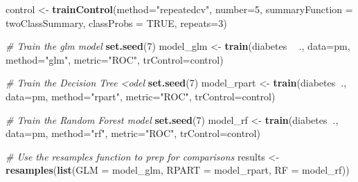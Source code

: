 \documentclass[]{book}
\newenvironment{Shaded}{\begin{snugshade}}{\end{snugshade}}
\newcommand{\KeywordTok}[1]{\textcolor[rgb]{0.13,0.29,0.53}{\textbf{#1}}}
\newcommand{\DataTypeTok}[1]{\textcolor[rgb]{0.13,0.29,0.53}{#1}}
\newcommand{\DecValTok}[1]{\textcolor[rgb]{0.00,0.00,0.81}{#1}}
\newcommand{\StringTok}[1]{\textcolor[rgb]{0.31,0.60,0.02}{#1}}
\newcommand{\CommentTok}[1]{\textcolor[rgb]{0.56,0.35,0.01}{\textit{#1}}}
\newcommand{\OtherTok}[1]{\textcolor[rgb]{0.56,0.35,0.01}{#1}}
\newcommand{\OperatorTok}[1]{\textcolor[rgb]{0.81,0.36,0.00}{\textbf{#1}}}
\newcommand{\NormalTok}[1]{#1}
\begin{document}
\begin{Shaded}
\begin{Highlighting}[]
\NormalTok{control <-}\StringTok{ }\KeywordTok{trainControl}\NormalTok{(}\DataTypeTok{method=}\StringTok{"repeatedcv"}\NormalTok{, }
                        \DataTypeTok{number=}\DecValTok{5}\NormalTok{, }
                        \DataTypeTok{summaryFunction =}\NormalTok{ twoClassSummary,}
                        \DataTypeTok{classProbs =} \OtherTok{TRUE}\NormalTok{,}
                        \DataTypeTok{repeats=}\DecValTok{3}\NormalTok{)}

\CommentTok{# Train the glm model}
\KeywordTok{set.seed}\NormalTok{(}\DecValTok{7}\NormalTok{)}
\NormalTok{model_glm <-}\StringTok{ }\KeywordTok{train}\NormalTok{(diabetes }\OperatorTok{~}\StringTok{ }\NormalTok{., }
                   \DataTypeTok{data=}\NormalTok{pm, }
                   \DataTypeTok{method=}\StringTok{"glm"}\NormalTok{, }
                   \DataTypeTok{metric=}\StringTok{"ROC"}\NormalTok{,}
                   \DataTypeTok{trControl=}\NormalTok{control)}

\CommentTok{# Train the Decision Tree <odel}
\KeywordTok{set.seed}\NormalTok{(}\DecValTok{7}\NormalTok{)}
\NormalTok{model_rpart <-}\StringTok{ }\KeywordTok{train}\NormalTok{(diabetes}\OperatorTok{~}\NormalTok{., }
                  \DataTypeTok{data=}\NormalTok{pm, }
                  \DataTypeTok{method=}\StringTok{"rpart"}\NormalTok{, }
                  \DataTypeTok{metric=}\StringTok{"ROC"}\NormalTok{,}
                  \DataTypeTok{trControl=}\NormalTok{control)}

\CommentTok{# Train the Random Forest model}
\KeywordTok{set.seed}\NormalTok{(}\DecValTok{7}\NormalTok{)}
\NormalTok{model_rf <-}\StringTok{ }\KeywordTok{train}\NormalTok{(diabetes}\OperatorTok{~}\NormalTok{., }
                  \DataTypeTok{data=}\NormalTok{pm, }
                  \DataTypeTok{method=}\StringTok{"rf"}\NormalTok{, }
                  \DataTypeTok{metric=}\StringTok{"ROC"}\NormalTok{,}
                  \DataTypeTok{trControl=}\NormalTok{control)}

\CommentTok{# Use the resamples function to prep for comparisons}
\NormalTok{results <-}\StringTok{ }\KeywordTok{resamples}\NormalTok{(}\KeywordTok{list}\NormalTok{(}\DataTypeTok{GLM   =}\NormalTok{ model_glm, }
                          \DataTypeTok{RPART =}\NormalTok{ model_rpart, }
                          \DataTypeTok{RF    =}\NormalTok{ model_rf))}
\end{Highlighting}
\end{Shaded}
\end{document}
